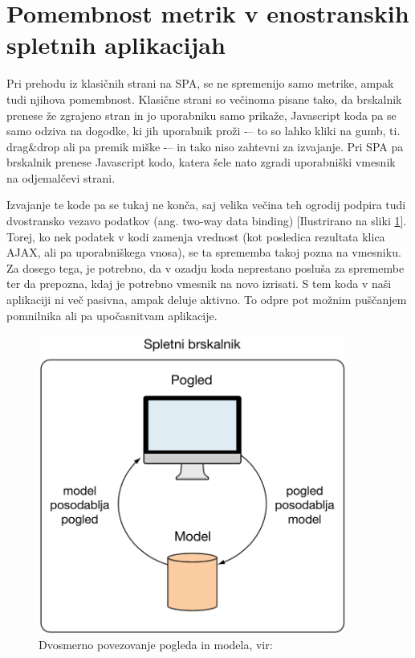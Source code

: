 \documentclass[a4paper, 12pt]{book}
\begin{document}
\section{Pomembnost metrik v enostranskih spletnih aplikacijah}

Pri prehodu iz klasičnih strani na SPA, se ne spremenijo samo metrike, ampak tudi njihova pomembnost. Klasične strani so večinoma pisane tako, da brskalnik prenese že zgrajeno stran in jo uporabniku samo prikaže, Javascript koda pa se samo odziva na dogodke, ki jih uporabnik proži -– to so lahko kliki na gumb, ti. drag\&drop ali pa premik miške -– in tako niso zahtevni za izvajanje. Pri SPA pa brskalnik prenese Javascript kodo, katera šele nato zgradi uporabniški vmesnik na odjemalčevi strani.

Izvajanje te kode pa se tukaj ne konča, saj velika večina teh ogrodij podpira tudi dvostransko vezavo podatkov (ang. two-way data binding) [Ilustrirano na sliki \ref{img:angularjs_two_way_databind}]. Torej, ko nek podatek v kodi zamenja vrednost (kot posledica rezultata klica AJAX, ali pa uporabniškega vnosa), se ta sprememba takoj pozna na vmesniku. Za dosego tega, je potrebno, da v ozadju koda neprestano posluša za spremembe ter da prepozna, kdaj je potrebno vmesnik na novo izrisati. S tem koda v naši aplikaciji ni več pasivna, ampak deluje aktivno. To odpre pot možnim puščanjem pomnilnika ali pa upočasnitvam aplikacije.

\begin{figure}[h]
	\begin{center}
		\includegraphics[width=0.9\textwidth]{AngularJS_dvosmerno_povezovanje.png}
	\end{center}
	\caption{Dvosmerno povezovanje pogleda in modela, vir: \cite{sp_skripta}}
	\label{img:angularjs_two_way_databind}
\end{figure}
\end{document}
